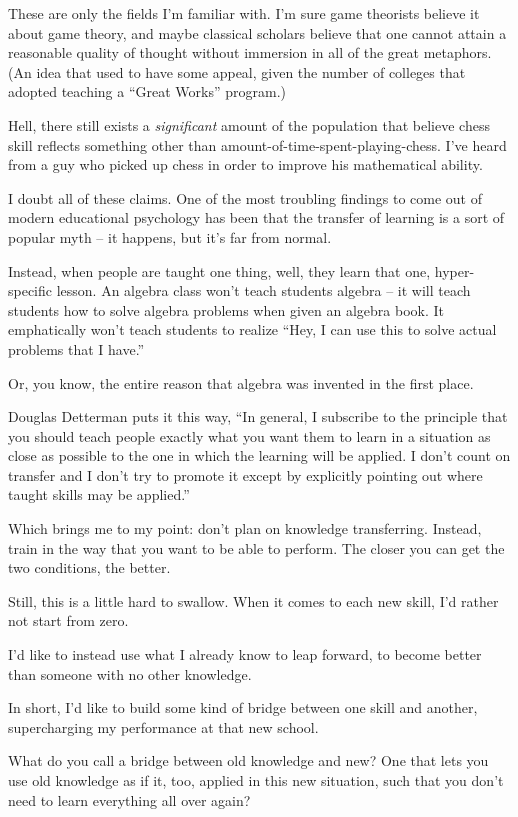 These are only the fields I'm familiar with. I'm sure game theorists believe it
about game theory, and maybe classical scholars believe that one cannot attain a
reasonable quality of thought without immersion in all of the great
metaphors. (An idea that used to have some appeal, given the number of colleges
that adopted teaching a ``Great Works'' program.)

Hell, there still exists a \textit{significant} amount of the population that
believe chess skill reflects something other than
amount-of-time-spent-playing-chess. I've heard from a guy who picked up chess in
order to improve his mathematical ability.

I doubt all of these claims. One of the most troubling findings to come out of
modern educational psychology has been that the transfer of learning is a sort
of popular myth -- it happens, but it's far from normal.

Instead, when people are taught one thing, well, they learn that one,
hyper-specific lesson. An algebra class won't teach students algebra -- it will
teach students how to solve algebra problems when given an algebra book. It
emphatically won't teach students to realize ``Hey, I can use this to solve
actual problems that I have.''

Or, you know, the entire reason that algebra was invented in the first place.

Douglas Detterman puts it this way, ``In general, I subscribe to the principle
that you should teach people exactly what you want them to learn in a situation
as close as possible to the one in which the learning will be applied.  I don't
count on transfer and I don't try to promote it except by explicitly pointing
out where taught skills may be applied.''

Which brings me to my point: don't plan on knowledge transferring. Instead,
train in the way that you want to be able to perform. The closer you can get the
two conditions, the better.

Still, this is a little hard to swallow.  When it comes to each new skill, I'd
rather not start from zero.

I'd like to instead use what I already know to leap forward, to become better
than someone with no other knowledge.

In short, I'd like to build some kind of bridge between one skill and another,
supercharging my performance at that new school.

What do you call a bridge between old knowledge and new? One that lets you use
old knowledge as if it, too, applied in this new situation, such that you don't
need to learn everything all over again?

